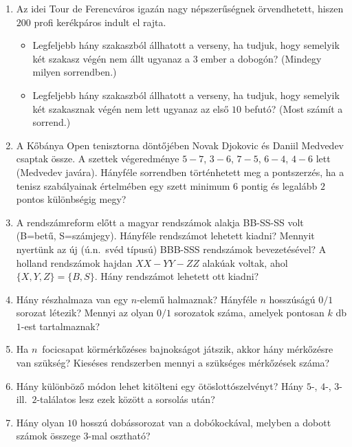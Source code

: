 \documentclass[a4paper,12pt]{article}
\begin{document}
\begin{enumerate}
        \item Az idei Tour de Ferencváros igazán nagy népszerűségnek örvendhetett, hiszen $200$ profi kerékpáros indult el rajta.
            \begin{itemize}
                \item Legfeljebb hány szakaszból állhatott a verseny, ha tudjuk, hogy semelyik két szakasz végén nem állt ugyanaz a $3$ ember a dobogón? (Mindegy milyen sorrendben.)
                \item Legfeljebb hány szakaszból állhatott a verseny, ha tudjuk, hogy semelyik két szakasznak végén nem lett ugyanaz az első $10$ befutó? (Most számít a sorrend.)
            \end{itemize}
        
        \item A Kőbánya Open tenisztorna döntőjében Novak Djokovic és Daniil Medvedev csaptak össze. A szettek végeredménye $5-7$, $3-6$, $7-5$, $6-4$, $4-6$ lett (Medvedev javára). Hányféle sorrendben történhetett meg a pontszerzés, ha a tenisz szabályainak értelmében egy szett minimum $6$ pontig és legalább $2$ pontos különbségig megy?

        \item
        A rendszámreform előtt a magyar rendszámok alakja BB-SS-SS volt (B=betű,
        S=számjegy). 
        Hányféle rendszámot lehetett kiadni? Mennyit nyertünk az új (ú.n.\ svéd
        típusú) BBB-SSS rendszámok bevezetésével? A holland rendszámok hajdan $XX-YY-ZZ$
        alakúak voltak, ahol $\{X,Y,Z\}=\{B,S\}$. Hány rendszámot lehetett ott kiadni?

        \item
        Hány részhalmaza van egy $n$-elemű halmaznak? Hányféle $n$ hosszúságú $0/1$
        sorozat létezik? Mennyi az olyan $0/1$ sorozatok száma, amelyek pontosan $k$
        db $1$-est tartalmaznak?

        \item
        Ha $n$\ focicsapat körmérkőzéses bajnokságot játszik, akkor hány mérkőzésre
        van szükség? Kieséses rendszerben mennyi a szükséges mérkőzések száma?

        \item
        Hány különböző módon lehet kitölteni egy ötöslottószelvényt? Hány
        $5$-, $4$-, $3$- ill.\ $2$-találatos lesz ezek között a sorsolás után?

        \item
        Hány olyan $10$ hosszú dobássorozat van a dobókockával, melyben a dobott
        számok összege $3$-mal osztható?


\end{enumerate}
\end{document}
